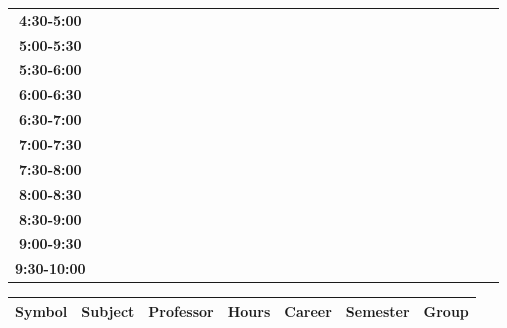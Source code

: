 \documentclass{article}
\begin{document}
\begin{table}[ht]
\begin{tabular}{|c|c|c|c|c|c|c|c|c|c|c|c|c|c|c|c|c|c|c|c|c|c|c|c|c|c|c|c|c|c|}
 \cline{1-8} 
\textbf{4:30-5:00} &   &   &   &   &   &   &   \\
 \cline{1-8} 
\textbf{5:00-5:30} &   &   &   &   &   &   &   \\
 \cline{1-8} 
\textbf{5:30-6:00} &   &   &   &   &   &   &   \\
 \cline{1-8} 
\textbf{6:00-6:30} &   &   &   &   &   &   &   \\
 \cline{1-8} 
\textbf{6:30-7:00} &   &   &   &   &   &   &   \\
 \cline{1-8} 
\textbf{7:00-7:30} &   &   &   &   &   &   &   \\
 \cline{1-8} 
\textbf{7:30-8:00} &   &   &   &   &   &   &   \\
 \cline{1-8} 
\textbf{8:00-8:30} &   &   &   &   &   &   &   \\
 \cline{1-8} 
\textbf{8:30-9:00} &   &   &   &   &   &   &   \\
 \cline{1-8} 
\textbf{9:00-9:30} &   &   &   &   &   &   &   \\
 \cline{1-8} 
\textbf{9:30-10:00} &   &   &   &   &   &   &   \\
 \cline{1-8} 
\end{tabular}\end{table}

        
        \begin{tabular}{|>{\centering\arraybackslash}m{2cm}|>{\centering\arraybackslash}m{4cm}|>{\centering\arraybackslash}m{2.15cm}|>{\centering\arraybackslash}m{1.8cm}|>{\centering\arraybackslash}m{2cm}|>{\centering\arraybackslash}m{2cm}|>{\centering\arraybackslash}m{2cm}|}
        \hline
        \textbf{Symbol} & \textbf{Subject} & \textbf{Professor} & \textbf{Hours} & \textbf{Career} & \textbf{Semester} & \textbf{Group} \\
        \hline
        \end{tabular}
                    

        \newpage
        

        
    
        

            
\end{document}
